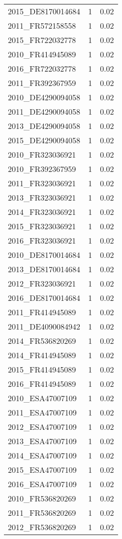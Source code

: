 \begin{table*}[htbp]
\begin{tabular}{lrr}
2015_DE8170014684 & 1 & 0.02 \\
2011_FR572158558 & 1 & 0.02 \\
2015_FR722032778 & 1 & 0.02 \\
2010_FR414945089 & 1 & 0.02 \\
2016_FR722032778 & 1 & 0.02 \\
2011_FR392367959 & 1 & 0.02 \\
2010_DE4290094058 & 1 & 0.02 \\
2011_DE4290094058 & 1 & 0.02 \\
2013_DE4290094058 & 1 & 0.02 \\
2015_DE4290094058 & 1 & 0.02 \\
2010_FR323036921 & 1 & 0.02 \\
2010_FR392367959 & 1 & 0.02 \\
2011_FR323036921 & 1 & 0.02 \\
2013_FR323036921 & 1 & 0.02 \\
2014_FR323036921 & 1 & 0.02 \\
2015_FR323036921 & 1 & 0.02 \\
2016_FR323036921 & 1 & 0.02 \\
2010_DE8170014684 & 1 & 0.02 \\
2013_DE8170014684 & 1 & 0.02 \\
2012_FR323036921 & 1 & 0.02 \\
2016_DE8170014684 & 1 & 0.02 \\
2011_FR414945089 & 1 & 0.02 \\
2011_DE4090084942 & 1 & 0.02 \\
2014_FR536820269 & 1 & 0.02 \\
2014_FR414945089 & 1 & 0.02 \\
2015_FR414945089 & 1 & 0.02 \\
2016_FR414945089 & 1 & 0.02 \\
2010_ESA47007109 & 1 & 0.02 \\
2011_ESA47007109 & 1 & 0.02 \\
2012_ESA47007109 & 1 & 0.02 \\
2013_ESA47007109 & 1 & 0.02 \\
2014_ESA47007109 & 1 & 0.02 \\
2015_ESA47007109 & 1 & 0.02 \\
2016_ESA47007109 & 1 & 0.02 \\
2010_FR536820269 & 1 & 0.02 \\
2011_FR536820269 & 1 & 0.02 \\
2012_FR536820269 & 1 & 0.02 \\

\end{tabular}
\end{table*}

